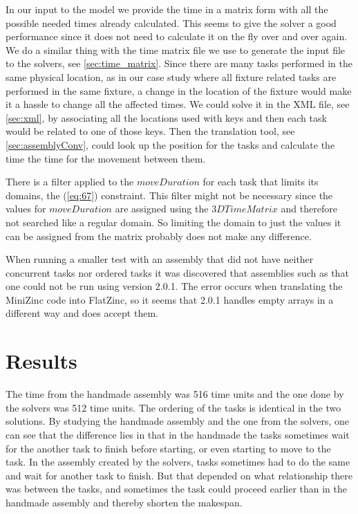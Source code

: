 In our input to the model we provide the time in a matrix form with all the possible needed times already calculated. This seems to give the solver a good performance since it does not need to calculate it on the fly over and over again. We do a similar thing with the time matrix file we use to generate the input file to the solvers, see \ref{sec:time_matrix}. Since there are many tasks performed in the same physical location, as in our case study where all fixture related tasks are performed in the same fixture, a change in the location of the fixture would make it a hassle to change all the affected times. We could solve it in the XML file, see \ref{sec:xml}, by associating all the locations used with keys and then each task would be related to one of those keys. Then the translation tool, see \ref{sec:assemblyConv}, could look up the position for the tasks and calculate the time the time for the movement between them.

There is a filter applied to the $moveDuration$ for each task that limits its domains, the (\ref{eq:67}) constraint. This filter might not be necessary since the values for $moveDuration$ are assigned using the $3DTimeMatrix$ and therefore not searched like a regular domain. So limiting the domain to just the values it can be assigned from the matrix probably does not make any difference.

When running a smaller test with an assembly that did not have neither concurrent tasks nor ordered tasks it was discovered that assemblies such as that one could not be run using version 2.0.1. The error occurs when translating the MiniZinc code into FlatZinc, so it seems that 2.0.1 handles empty arrays in a different way and does accept them.

\section{Results}
The time from the handmade assembly was 516 time units and the one done by the solvers was 512 time units. The ordering of the tasks is identical in the two solutions. By studying the handmade assembly and the one from the solvers, one can see that the difference lies in that in the handmade the tasks sometimes wait for the another task to finish before starting, or even starting to move to the task. In the assembly created by the solvers, tasks sometimes had to do the same and wait for another task to finish. But that depended on what relationship there was between the tasks, and sometimes the task could proceed earlier than in the handmade assembly and thereby shorten the makespan.

